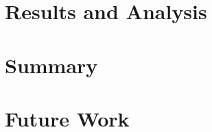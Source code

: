 \documentclass[review]{elsarticle}
\begin{document}
\section{Results and Analysis}\label{ra}

\section{Summary}\label{summary}

\section{Future Work}\label{future}




\end{document}
